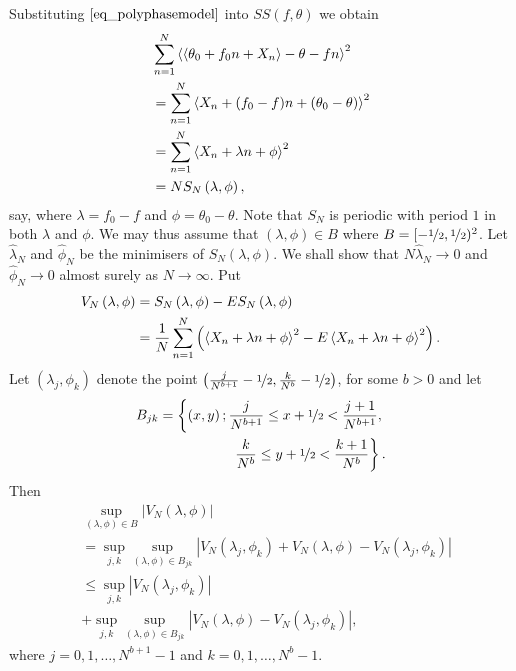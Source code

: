Substituting $\eqref{eq_polyphasemodel}$ into $SS\left( f,\theta\right) $ we
obtain
\begin{align*}
&  \sum_{n=1}^{N}\left<  \left<  \theta_{0} + f_{0}n + X_{n}  \right> - \theta - fn  \right>
^{2}\\
&  =\sum_{n=1}^{N}\left<   X_{n}+(f_0 - f)n + (\theta_0-\theta)  \right>  ^{2}\\
&  =\sum_{n=1}^{N}\left<   X_{n}+\lambda n+\phi  \right>  ^{2}\\
&  =NS_{N}\left(  \lambda,\phi\right)  ,
\end{align*}
say, where $\lambda=f_{0}-f$ and $\phi=\theta_{0}-\theta$.  Note that $S_N$ is
periodic with period $1$ in both $\lambda$ and $\phi$.  We may thus assume
that $(\lambda, \phi) \in B$ where $B = [-\nicefrac{1}{2},
\nicefrac{1}{2})^2$. Let $\widehat{\lambda}_{N}$ and $\widehat{\phi}_{N}$ be
the minimisers of $S_{N}\left( \lambda,\phi\right)$.  We shall show that
$N\widehat{\lambda}_{N}\rightarrow0$ and $\widehat{\phi}_{N}\rightarrow 0$
almost surely as $N\rightarrow\infty$.  Put
\begin{align*}
V_{N}\left(  \lambda,\phi\right)   &  =S_{N}\left(  \lambda,\phi\right)
-ES_{N}\left(  \lambda,\phi\right) \\
&  =\frac{1}{N}\sum_{n=1}^{N}\left(  \left<   X_{n}+\lambda n+\phi  \right>
^{2}-E\left<   X_{n}+\lambda n+\phi  \right>  ^{2}\right)  .
\end{align*}
Let $(\lambda_j, \phi_k)$ denote the point $\left(  \frac{j}{N^{b+1}} - \nicefrac{1}{2},\frac{k}{N^{b}} - \nicefrac{1}{2}\right)$, for some $b>0$ and let
\begin{align*}
B_{jk}= \left\{ \left(  x,y\right)  ; \frac{j}{N^{b+1}}\leq x + \nicefrac{1}{2}<\frac
{j+1}{N^{b+1}}, \right. \\ \left. \frac{k}{N^{b}}\leq y + \nicefrac{1}{2} <\frac{k+1}{N^{b}} \right\}  .
\end{align*}
Then%
\begin{align*}
&\sup_{\left(  \lambda,\phi\right)  \in B}\left\vert V_{N}\left(  \lambda
,\phi\right)  \right\vert \\  &=\sup_{j,k}\sup_{\left(  \lambda,\phi\right)
\in B_{jk}}\left\vert V_{N}\left(  \lambda_{j},\phi_{k}\right) + V_{N}\left(
\lambda,\phi\right)  -V_{N}\left(  \lambda_{j},\phi_{k}\right)  \right\vert \\
&  \leq\sup_{j,k}\left\vert V_{N}\left(  \lambda_{j},\phi_{k}\right)
\right\vert \\
&+\sup_{j,k}\sup_{\left(  \lambda,\phi\right)  \in B_{jk}%
}\left\vert V_{N}\left(  \lambda,\phi\right)  -V_{N}\left(  \lambda_{j}%
,\phi_{k}\right)  \right\vert ,
\end{align*}
where $j = 0,1,\ldots,N^{b+1}-1$ and $k=0,1,\ldots,N^{b}-1$.

